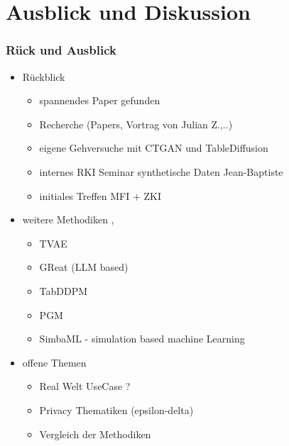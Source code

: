 \documentclass[
	11pt, %
]{beamer}
\begin{document}
\section{Ausblick und Diskussion}

\begin{frame}
    \frametitle{Rück und Ausblick}
    \begin{itemize}
        \item Rückblick
        \begin{itemize}
            \item spannendes Paper gefunden
            \item Recherche (Papers, Vortrag von Julian Z.,..)
            \item eigene Gehversuche mit CTGAN und TableDiffusion
            \item internes RKI Seminar synthetische Daten Jean-Baptiste
            \item initiales Treffen MFI + ZKI
        \end{itemize}
        \item weitere Methodiken \parencite{shi_comprehensive_2025}, \parencite{du_towards_2024}
        \begin{itemize}
            \item TVAE
            \item GReat (LLM based)
            \item TabDDPM
            \item PGM
            \item SimbaML - simulation based machine Learning
        \end{itemize}   
        \item offene Themen
        \begin{itemize}
            \item Real Welt UseCase ?
            \item Privacy Thematiken (epsilon-delta)
            \item Vergleich der Methodiken
        \end{itemize}        
    \end{itemize}
\end{frame}
\end{document}

